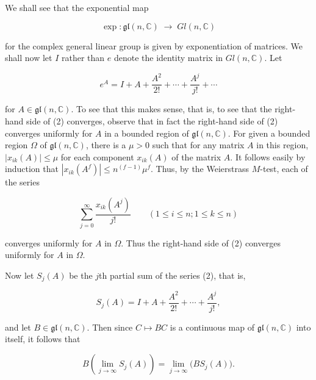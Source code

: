 \begin{examples}\label{thm:3.35}
We shall see that the exponential map

\begin{equation}
\tag{1}\label{eq:3.35:1}
\exp\colon\mathfrak{gl}(n,\mathbb{C})\;\to\;Gl(n,\mathbb{C})
\end{equation}

for the complex general linear group is given by exponentiation of matrices. We shall now let $I$ rather than $e$ denote the identity matrix in $Gl(n,\mathbb{C})$. Let

\begin{equation}
\tag{2}\label{eq:3.35:2}
e^{A}=I+A+\frac{A^{2}}{2!}+\cdots+\frac{A^{j}}{j!}+\cdots
\end{equation}

for $A \in \mathfrak{gl}(n, \mathbb{C})$. To see that this makes sense, that is, to see that the right-hand side of (2) converges, observe that in fact the right-hand side of (2) converges uniformly for $A$ in a bounded region of $\mathfrak{gl}(n, \mathbb{C})$. For given a bounded region $\Omega$ of $\mathfrak{gl}(n, \mathbb{C})$, there is a $\mu > 0$ such that for any matrix $A$ in this region, $|x_{ik}(A)| \leq \mu$ for each component $x_{ik}(A)$ of the matrix $A$. It follows easily by induction that $|x_{ik}(A^f)| \leq n^{(f-1)}\mu^f$. Thus, by the Weierstrass $M$-test, each of the series

\begin{equation}
\tag{3}\label{eq:3.35:3}
\sum_{j=0}^{\infty}\frac{x_{ik}(A^{j})}{j!}\qquad(1\leq i\leq n;1\leq k\leq n)
\end{equation}

converges uniformly for $A$ in $\Omega$. Thus the right-hand side of (2) converges uniformly for $A$ in $\Omega$.

Now let $S_{j}(A)$ be the $j$th partial sum of the series (2), that is,

\begin{equation}
\tag{4}\label{eq:3.35:4}
S_{j}(A)=I+A+\frac{A^{2}}{2!}+\cdots+\frac{A^{j}}{j!},
\end{equation}

and let $B \in \mathfrak{gl}(n,\mathbb{C})$. Then since $C \mapsto BC$ is a continuous map of $\mathfrak{gl}(n,\mathbb{C})$ into itself, it follows that

\begin{equation}
\tag{5}\label{eq:3.35:5}
B\left(\lim_{j\to\infty}S_{j}(A)\right)=\lim_{j\to\infty}\bigl(B S_{j}(A)\bigr).
\end{equation}


\end{examples}
